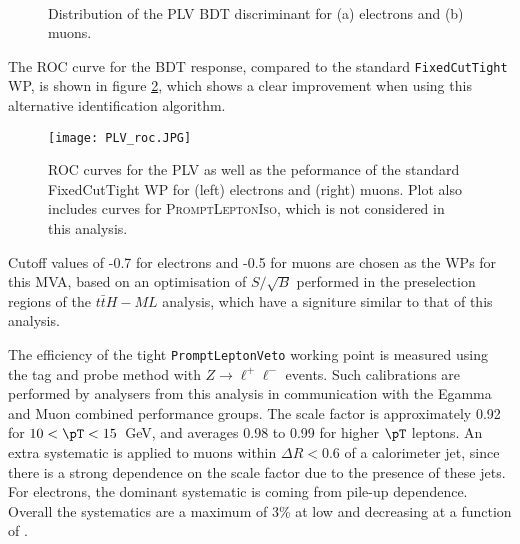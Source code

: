 \begin{figure}[H]
\begin{center}
    \\
    \label{fig:PLV_score}
    \caption{Distribution of the PLV BDT discriminant for (a) electrons and (b) muons.}
\end{center}
\end{figure}

The ROC curve for the BDT response, compared to the standard \verb!FixedCutTight! WP, is shown in figure \ref{fig:PLV_roc}, which shows a clear improvement when using this alternative identification algorithm.

\begin{figure}[H]
\begin{center}
    \texttt{[image: PLV\_roc.JPG]}
    \label{fig:PLV_roc}
    \caption{ROC curves for the PLV as well as the peformance of the standard FixedCutTight WP for (left) electrons and (right) muons. Plot also includes curves for \textsc{PromptLeptonIso}, which is not considered in this analysis.}
\end{center}
\end{figure}

Cutoff values of -0.7 for electrons and -0.5 for muons are chosen as the WPs for this MVA, based on an optimisation of $S/\sqrt{B}$ performed in the preselection regions of the $t\bar{t}H-ML$ analysis, which have a signiture similar to that of this analysis.

The efficiency of the tight \texttt{PromptLeptonVeto} working point is measured using the tag and probe method with $Z\rightarrow \ell^{+}\ell^{-}$ events. Such calibrations are performed by analysers from this analysis in communication with the Egamma and Muon combined performance groups. The scale factor is approximately 0.92 for $10 < \pT < 15$~GeV, and averages 0.98 to 0.99 for higher $\pT$ leptons. An extra systematic is applied to muons within $\Delta R < 0.6$ of a calorimeter jet, since there is a strong dependence on the scale factor due to the presence of these jets. For electrons, the dominant systematic  is coming from pile-up dependence. Overall the systematics are a maximum of 3\% at low \pT and decreasing at a function of \pT.
